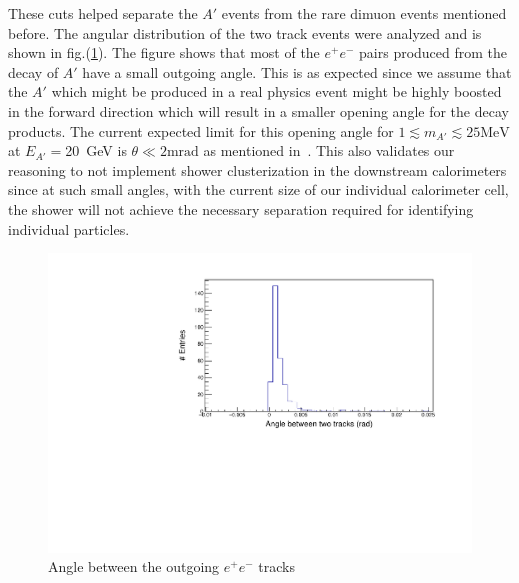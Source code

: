 These cuts helped separate the $A'$ events from the rare dimuon events mentioned before. The angular distribution of the two track events were analyzed and is shown in fig.(\ref{fig:reco_angle}). The figure shows that most of the $e^+ e^-$ pairs produced from the decay of $A'$ have a small outgoing angle. This is as expected since we assume that the $A'$ which might be produced in a real physics event might be highly boosted in the forward direction which will result in a smaller opening angle for the decay products. The current expected limit for this opening angle for $1 \lesssim m_{A'}\lesssim 25 \text{MeV}$ at $E_{A'}=$20~GeV is $\theta \ll 2\text{mrad}$ as mentioned in~\cite{Banerjee_2018}. This also validates our reasoning to not implement shower clusterization in the downstream calorimeters since at such small angles, with the current size of our individual calorimeter cell, the shower will not achieve the necessary separation required for identifying individual particles.
\FloatBarrier
 \begin{figure}[t!]
 \centering
 \includegraphics[width=\textwidth]{thesis_figures/MC_reco/ang_dist_final.pdf}
 \caption{Angle between the outgoing $e^+e^-$ tracks}
 \label{fig:reco_angle}
 \end{figure}


